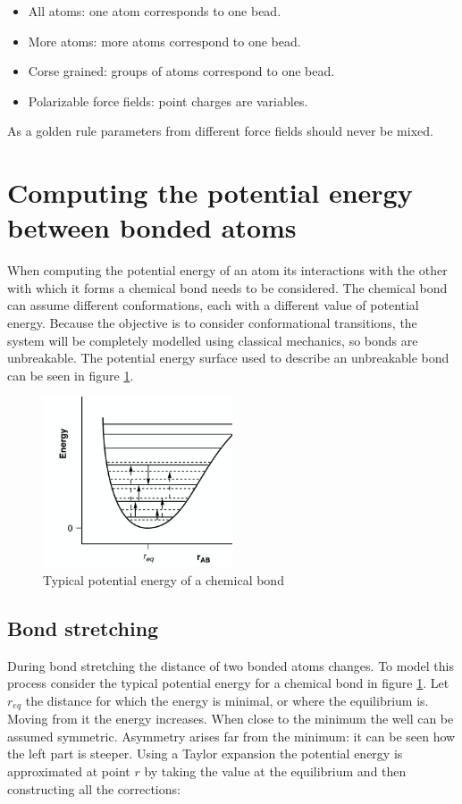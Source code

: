 	\begin{multicols}{2}
		\begin{itemize}
			\item All atoms: one atom corresponds to one bead.
			\item More atoms: more atoms correspond to one bead.
			\item Corse grained: groups of atoms correspond to one bead.
			\item Polarizable force fields: point charges are variables.
		\end{itemize}
	\end{multicols}

	As a golden rule parameters from different force fields should never be mixed.


\section{Computing the potential energy between bonded atoms}
When computing the potential energy of an atom its interactions with the other with which it forms a chemical bond needs to be considered.
The chemical bond can assume different conformations, each with a different value of potential energy.
Because the objective is to consider conformational transitions, the system will be completely modelled using classical mechanics, so bonds are unbreakable.
The potential energy surface used to describe an unbreakable bond can be seen in figure \ref{fig:chem-bond}.

\begin{figure}[H]
	\centering
	\includegraphics[width=0.5\textwidth]{chem-bond}
	\caption{Typical potential energy of a chemical bond}
	\label{fig:chem-bond}
\end{figure}

	\subsection{Bond stretching}
	During bond stretching the distance of two bonded atoms changes.
	To model this process consider the typical potential energy for a chemical bond in figure \ref{fig:chem-bond}.
	Let $r_{eq}$ the distance for which the energy is minimal, or where the equilibrium is.
	Moving from it the energy increases.
	When close to the minimum the well can be assumed symmetric.
	Asymmetry arises far from the minimum: it can be seen how the left part is steeper.
	Using a Taylor expansion the potential energy is approximated at point $r$ by taking the value at the equilibrium and then constructing all the corrections:

